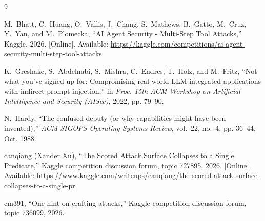 \documentclass[conference]{IEEEtran}
\begin{document}
\begin{thebibliography}{9}

M.~Bhatt, C.~Huang, O.~Vallis, J.~Chang, S.~Mathews, B.~Gatto, M.~Cruz,
Y.~Yan, and M.~Plomecka, ``AI Agent Security - Multi-Step Tool Attacks,''
Kaggle, 2026. [Online]. Available:
\url{https://kaggle.com/competitions/ai-agent-security-multi-step-tool-attacks}

K.~Greshake, S.~Abdelnabi, S.~Mishra, C.~Endres, T.~Holz, and M.~Fritz,
``Not what you've signed up for: Compromising real-world LLM-integrated
applications with indirect prompt injection,'' in \emph{Proc. 15th ACM
Workshop on Artificial Intelligence and Security (AISec)}, 2022, pp. 79--90.

N.~Hardy, ``The confused deputy (or why capabilities might have been
invented),'' \emph{ACM SIGOPS Operating Systems Review}, vol.~22, no.~4,
pp. 36--44, Oct. 1988.

canqiang (Xander Xu), ``The Scored Attack Surface Collapses to a Single
Predicate,'' Kaggle competition discussion forum, topic 727895, 2026.
[Online]. Available:
\url{https://www.kaggle.com/writeups/canqiang/the-scored-attack-surface-collapses-to-a-single-pr}

cm391, ``One hint on crafting attacks,'' Kaggle competition discussion
forum, topic 736099, 2026.

\end{thebibliography}
\end{document}
